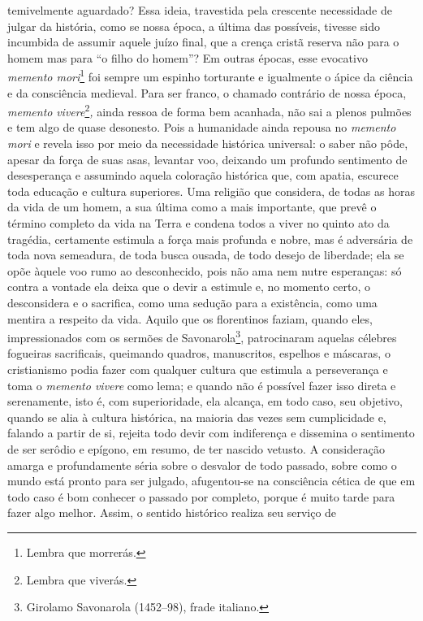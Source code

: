 temivelmente aguardado? Essa ideia, travestida pela crescente
necessidade de julgar da história, como se nossa época, a última das
possíveis, tivesse sido incumbida de assumir aquele juízo final, que a
crença cristã reserva não para o homem mas para ``o filho do homem''? Em
outras épocas, esse evocativo \emph{memento mori}\footnote{Lembra que
  morrerás.} foi sempre um espinho torturante e igualmente o ápice da
ciência e da consciência medieval. Para ser franco, o chamado contrário
de nossa época, \emph{memento} \emph{vivere}\footnote{Lembra que
  viverás.}\emph{,} ainda ressoa de forma bem acanhada, não sai a plenos
pulmões e tem algo de quase desonesto. Pois a humanidade ainda repousa
no \emph{memento mori} e revela isso por meio da necessidade histórica
universal: o saber não pôde, apesar da força de suas asas, levantar voo,
deixando um profundo sentimento de desesperança e assumindo aquela
coloração histórica que, com apatia, escurece toda educação e cultura
superiores. Uma religião que considera, de todas as horas da vida de um
homem, a sua última como a mais importante, que prevê o término completo
da vida na Terra e condena todos a viver no quinto ato da tragédia,
certamente estimula a força mais profunda e nobre, mas é adversária de
toda nova semeadura, de toda busca ousada, de todo desejo de liberdade;
ela se opõe àquele voo rumo ao desconhecido, pois não ama nem nutre
esperanças: só contra a vontade ela deixa que o devir a estimule e, no
momento certo, o desconsidera e o sacrifica, como uma sedução para a
existência, como uma mentira a respeito da vida. Aquilo que os
florentinos faziam, quando eles, impressionados com os sermões de
Savonarola\footnote{Girolamo Savonarola (1452--98), frade italiano.},
patrocinaram aquelas célebres fogueiras sacrificais, queimando quadros,
manuscritos, espelhos e máscaras, o cristianismo podia fazer com
qualquer cultura que estimula a perseverança e toma o \emph{memento
vivere} como lema; e quando não é possível fazer isso direta e
serenamente, isto é, com superioridade, ela alcança, em todo caso, seu
objetivo, quando se alia à cultura histórica, na maioria das vezes sem
cumplicidade e, falando a partir de si, rejeita todo devir com
indiferença e dissemina o sentimento de ser serôdio e epígono, em
resumo, de ter nascido vetusto. A consideração amarga e profundamente
séria sobre o desvalor de todo passado, sobre como o mundo está pronto
para ser julgado, afugentou-se na consciência cética de que em todo 
caso é bom conhecer o passado por completo, porque é muito tarde para
fazer algo melhor. Assim, o sentido histórico realiza seu serviço de
